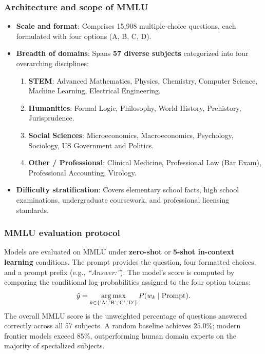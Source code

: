 \documentclass[../../main.tex]{subfiles}
\begin{document}
\subsubsection{Architecture and scope of MMLU}
\begin{itemize}
    \item \textbf{Scale and format}: Comprises 15,908 multiple-choice questions, each formulated with four options (A, B, C, D).
    \item \textbf{Breadth of domains}: Spans \textbf{57 diverse subjects} categorized into four overarching disciplines:
    \begin{enumerate}
        \item \textbf{STEM}: Advanced Mathematics, Physics, Chemistry, Computer Science, Machine Learning, Electrical Engineering.
        \item \textbf{Humanities}: Formal Logic, Philosophy, World History, Prehistory, Jurisprudence.
        \item \textbf{Social Sciences}: Microeconomics, Macroeconomics, Psychology, Sociology, US Government and Politics.
        \item \textbf{Other / Professional}: Clinical Medicine, Professional Law (Bar Exam), Professional Accounting, Virology.
    \end{enumerate}
    \item \textbf{Difficulty stratification}: Covers elementary school facts, high school examinations, undergraduate coursework, and professional licensing standards.
\end{itemize}

\subsubsection{MMLU evaluation protocol}
Models are evaluated on MMLU under \textbf{zero-shot} or \textbf{5-shot in-context learning} conditions. The prompt provides the question, four formatted choices, and a prompt prefix (e.g., \textit{``Answer:''}). The model's score is computed by comparing the conditional log-probabilities assigned to the four option tokens:
\begin{equation}
\label{eq:mmlu_scoring}
\hat{y} = \operatorname*{\mathrm{arg\,max}}_{k \in \{\text{'A'}, \text{'B'}, \text{'C'}, \text{'D'}\}} P(w_k \mid \text{Prompt}).
\end{equation}
The overall MMLU score is the unweighted percentage of questions answered correctly across all 57 subjects. A random baseline achieves $25.0\%$; modern frontier models exceed $85\%$, outperforming human domain experts on the majority of specialized subjects.
\end{document}
